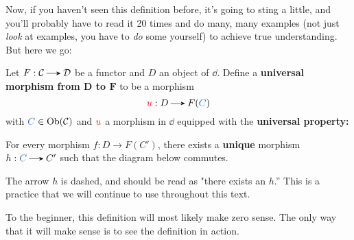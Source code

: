     Now, if you haven't seen this definition before, it's going to sting a little, 
    and you'll probably have to read it 20 times and do many, many examples (not just 
    \emph{look} at examples, you have to \emph{do} some yourself) to 
    achieve true understanding. But here we go:

    \begin{definition}\label{definition:universal_morphism_from_D_to_F}
        Let $F: \cc \to \dd$ be a functor and $D$ an object of $\dd$.
        Define a \textbf{universal morphism from $\bm{D}$ to $\bm{F}$} 
        to be a morphism
        \[
            \textcolor{red}{u}: D \to F(\textcolor{NavyBlue}{C})
        \]
        with $\textcolor{NavyBlue}{C} \in \ob(\cc)$ and 
        $\textcolor{Red}{u}$ a morphism in $\dd$ equipped with the \textbf{universal property:}
        \begin{center}
            \begin{minipage}{0.8\textwidth}
            For every morphism $f: D \to F(C')$, there 
            exists a \textbf{unique} morphism $h: \textcolor{NavyBlue}{C} \to C'$ 
            such that the diagram below commutes. 
            \end{minipage}
            \begin{center}
                \hspace{1cm}
            \end{center}
        \end{center}
        The arrow $h$ is dashed, and should be read as 
        "there exists an $h$.'' This is a practice 
        that we will continue to use throughout this text. 
    \end{definition}

    \begin{remark}
        To the beginner, this definition will most likely make zero sense. 
        The only way that it will make sense is to see the definition in action.
    \end{remark}


